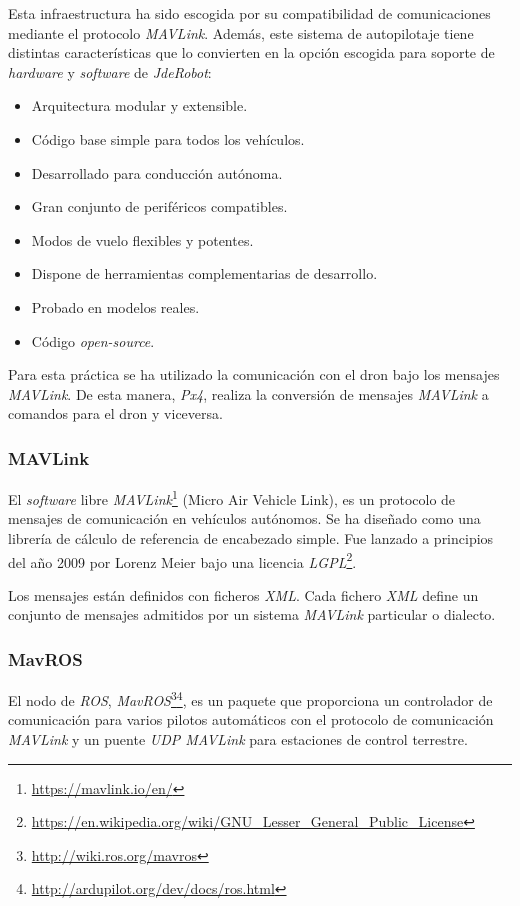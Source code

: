 Esta infraestructura ha sido escogida por su compatibilidad de comunicaciones mediante el protocolo \textit{MAVLink}. Además, este sistema de autopilotaje tiene distintas características que lo convierten en la opción escogida para soporte de \textit{hardware} y \textit{software} de \textit{JdeRobot}:
\begin{itemize}
    \item Arquitectura modular y extensible.
    \item Código base simple para todos los vehículos.
    \item Desarrollado para conducción autónoma.
    \item Gran conjunto de periféricos compatibles.
    \item Modos de vuelo flexibles y potentes.
    \item Dispone de herramientas complementarias de desarrollo.
    \item Probado en modelos reales.
    \item Código \textit{open-source}.
\end{itemize}

Para esta práctica se ha utilizado la comunicación con el dron bajo los mensajes \textit{MAVLink}. De esta manera, \textit{Px4}, realiza la conversión de mensajes \textit{MAVLink} a comandos para el dron y viceversa.

\subsubsection{MAVLink}
El \textit{software} libre \textit{MAVLink}\footnote{\url{https://mavlink.io/en/}} (Micro Air Vehicle Link), es un protocolo de mensajes de comunicación en vehículos autónomos. Se ha diseñado como una librería de cálculo de referencia de encabezado simple. Fue lanzado a principios del año 2009 por Lorenz Meier bajo una licencia \textit{LGPL}\footnote{\url{https://en.wikipedia.org/wiki/GNU_Lesser_General_Public_License}}.

Los mensajes están definidos con ficheros \textit{XML}. Cada fichero \textit{XML} define un conjunto de mensajes admitidos por un sistema \textit{MAVLink} particular o dialecto.

\subsubsection{MavROS}
El nodo de \textit{ROS}, \textit{MavROS}\footnote{\url{http://wiki.ros.org/mavros}}\footnote{\url{http://ardupilot.org/dev/docs/ros.html}}, es un paquete que proporciona un controlador de comunicación para varios pilotos automáticos con el protocolo de comunicación \textit{MAVLink} y un puente \textit{UDP MAVLink} para estaciones de control terrestre.

